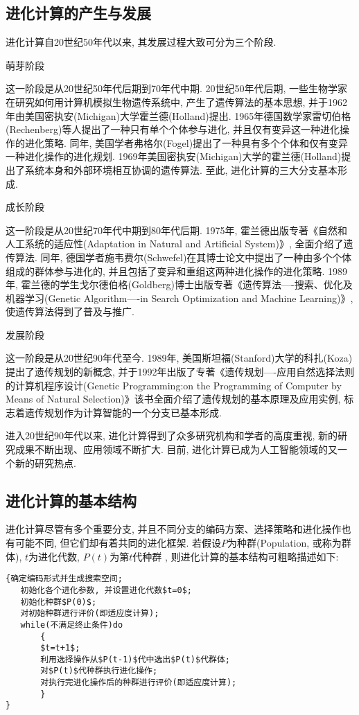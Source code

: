 \subsection{进化计算的产生与发展}
 进化计算自20世纪50年代以来, 其发展过程大致可分为三个阶段.

       萌芽阶段

     这一阶段是从20世纪50年代后期到70年代中期. 20世纪50年代后期, 一些生物学家在研究如何用计算机模拟生物遗传系统中, 产生了遗传算法的基本思想, 并于1962年由美国密执安(Michigan)大学霍兰德(Holland)提出.
     1965年德国数学家雷切伯格(Rechenberg)等人提出了一种只有单个个体参与进化, 并且仅有变异这一种进化操作的进化策略.
     同年, 美国学者弗格尔(Fogel)提出了一种具有多个个体和仅有变异一种进化操作的进化规划.
     1969年美国密执安(Michigan)大学的霍兰德(Holland)提出了系统本身和外部环境相互协调的遗传算法. 至此, 进化计算的三大分支基本形成.

      成长阶段

     这一阶段是从20世纪70年代中期到80年代后期. 1975年, 霍兰德出版专著《自然和人工系统的适应性(Adaptation in Natural and Artificial System)》, 全面介绍了遗传算法.
     同年, 德国学者施韦费尔(Schwefel)在其博士论文中提出了一种由多个个体组成的群体参与进化的, 并且包括了变异和重组这两种进化操作的进化策略.
     1989年, 霍兰德的学生戈尔德伯格(Goldberg)博士出版专著《遗传算法----搜索、优化及机器学习(Genetic Algorithm----in Search Optimization and Machine Learning)》, 使遗传算法得到了普及与推广.

     发展阶段

     这一阶段是从20世纪90年代至今. 1989年, 美国斯坦福(Stanford)大学的科扎(Koza)提出了遗传规划的新概念, 并于1992年出版了专著《遗传规划----应用自然选择法则的计算机程序设计(Genetic Programming:on the Programming of Computer by Means of Natural Selection)》该书全面介绍了遗传规划的基本原理及应用实例, 标志着遗传规划作为计算智能的一个分支已基本形成.

    进入20世纪90年代以来, 进化计算得到了众多研究机构和学者的高度重视, 新的研究成果不断出现、应用领域不断扩大.
    目前, 进化计算已成为人工智能领域的又一个新的研究热点.

\subsection{进化计算的基本结构}
进化计算尽管有多个重要分支, 并且不同分支的编码方案、选择策略和进化操作也有可能不同, 但它们却有着共同的进化框架.
若假设$P$为种群(Population, 或称为群体), $t$为进化代数, $P(t)$为第$t$代种群 , 则进化计算的基本结构可粗略描述如下:
\begin{Verbatim}
{确定编码形式并生成搜索空间;
   初始化各个进化参数, 并设置进化代数$t=0$;
   初始化种群$P(0)$;
   对初始种群进行评价(即适应度计算);
   while(不满足终止条件)do
       {
       $t=t+1$;
       利用选择操作从$P(t-1)$代中选出$P(t)$代群体;
       对$P(t)$代种群执行进化操作;
       对执行完进化操作后的种群进行评价(即适应度计算);
       }
}
\end{Verbatim}

